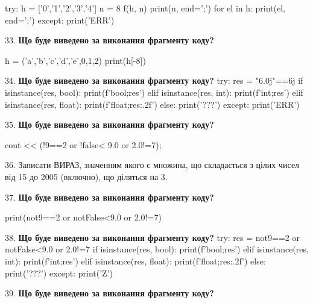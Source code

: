 \documentclass[11pt]{article}
\begin{document}
try:
    h = ['0','1','2','3','4']
    n = 8
    f(h, n)
    print(n, end=';')
    for el in h:
        print(el, end=';')
except:
    print('ERR')
\par\vspace{5mm}

33. \textbf{Що буде виведено за виконання фрагменту коду?}

h = ('a','b','c','d','e',0,1,2)
print(h[-8])

\par\vspace{5mm}

34. \textbf{Що буде виведено за виконання фрагменту коду?}
try:
    res = "6.0j"==6j
    if isinstance(res, bool):
        print(f'bool;{res}')
    elif isinstance(res, int):
        print(f'int;{res}')
    elif isinstance(res, float):
        print(f'float;{res:.2f}')
    else:
        print('???')
except:
    print('ERR')
\par\vspace{5mm}

35. \textbf{Що буде виведено за виконання фрагменту коду?}

cout << (!9==2 or !false< 9.0 or 2.0!=7);
\par\vspace{5mm}

36. 
Записати ВИРАЗ, значенням якого є множина, що складається з цілих чисел від 15 до 2005 (включно), що діляться на 3.\par\vspace{5mm}

37. \textbf{Що буде виведено за виконання фрагменту коду?}

print(not9==2 or notFalse<9.0 or 2.0!=7)
\par\vspace{5mm}

38. \textbf{Що буде виведено за виконання фрагменту коду?}
try:
    res = not9==2 or notFalse<9.0 or 2.0!=7
    if isinstance(res, bool):
        print(f'bool;{res}')
    elif isinstance(res, int):
        print(f'int;{res}')
    elif isinstance(res, float):
        print(f'float;{res:.2f}')
    else:
        print('???')
except:
    print('Z')
\par\vspace{5mm}

39. \textbf{Що буде виведено за виконання фрагменту коду?}
\end{document}
